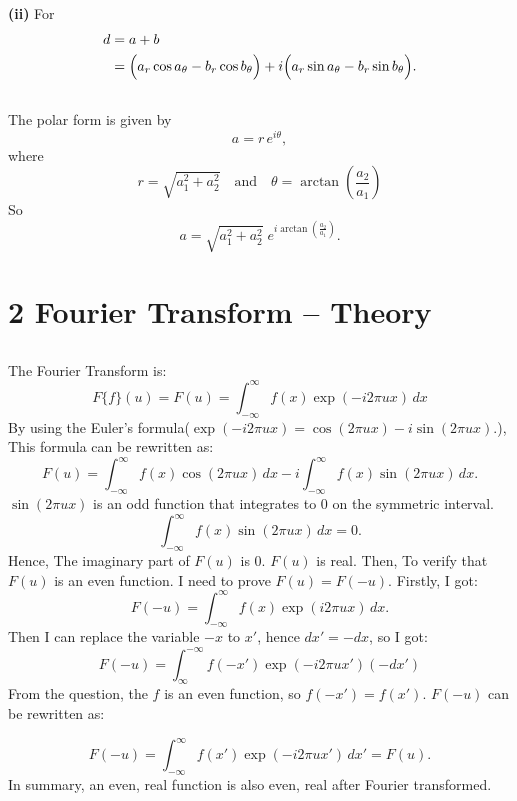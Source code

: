 \documentclass[12pt]{article}
\begin{document}
\textbf{(ii)} For 
\begin{equation}
\begin{aligned}
d &= a + b\\
& = \Bigl(a_r\cos a_\theta - b_r\cos b_\theta\Bigr) + i\Bigl(a_r\sin a_\theta - b_r\sin b_\theta\Bigr).
\end{aligned}
\end{equation}
\subsection{}

The polar form is given by
\[
a = r\, e^{i\theta},
\]
where
\[
r = \sqrt{a_1^2 + a_2^2} \quad \text{and} \quad \theta = \arctan\!\left(\frac{a_2}{a_1}\right)
\]
So
\[
a = \sqrt{a_1^2+a_2^2}\; e^{i\arctan\!\left(\frac{a_2}{a_1}\right)}.
\]


\section{2 Fourier Transform – Theory}
\subsection{}
The Fourier Transform is:
\[F\{f\}(u) = F(u) = \int_{-\infty}^{\infty} f(x) \exp(-i 2\pi ux) \,dx\]
By using the Euler's formula(\(\exp(-i 2\pi ux) = \cos(2\pi ux) - i\sin(2\pi ux).\)), This formula can be rewritten as:
\[
F(u) = \int_{-\infty}^{\infty} f(x) \cos(2\pi ux) \,dx - i \int_{-\infty}^{\infty} f(x) \sin(2\pi ux) \,dx.
\]
\(\sin(2\pi ux)\) is an odd function that integrates to 0 on the symmetric interval.
\[
\int_{-\infty}^{\infty} f(x) \sin(2\pi ux) \,dx = 0.
\]
Hence, The imaginary part of \(F(u)\) is 0. \(F(u)\) is real.
\newline
Then, To verify that \(F(u)\) is an even function. I need to prove \(F(u) = F(-u)\).
Firstly, I got:
\[
F(-u) = \int_{-\infty}^{\infty} f(x) \exp(i 2\pi ux) \,dx.
\]
Then I can replace the variable \(-x\) to \(x'\), hence \(dx' = -dx\), so I got:
\[
F(-u) = \int_{\infty}^{-\infty} f(-x') \exp(-i 2\pi ux') (-dx') 
\]
From the question, the \(f\) is an even function, so \(f(-x')=f(x')\).
\(F(-u)\) can be rewritten as:

\[F(-u) = \int_{-\infty}^{\infty} f(x') \exp(-i 2\pi ux') \,dx' = F(u).\]
In summary, an even, real function is also even, real after Fourier transformed.
\end{document}
